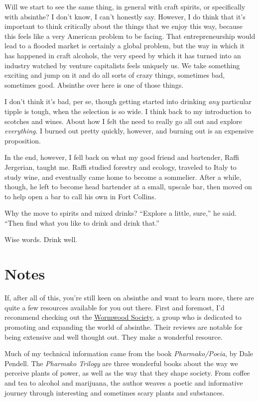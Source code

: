 \documentclass[12pt,letterpaper,oneside]{memoir}
\begin{document}
  Will we start to see the same thing, in general with craft spirits, or specifically with absinthe?  I don't know, I can't honestly say.  However, I do think that it's important to think critically about the things that we enjoy this way, because this feels like a very American problem to be facing.  That entrepreneurship would lead to a flooded market is certainly a global problem, but the way in which it has happened in craft alcohols, the very speed by which it has turned into an industry watched by venture capitalists feels uniquely us.  We take something exciting and jump on it and do all sorts of crazy things, sometimes bad, sometimes good.  Absinthe over here is one of those things.

  I don't think it's bad, per se, though getting started into drinking \textit{any} particular tipple is tough, when the selection is so wide.  I think back to my introduction to scotches and wines.  About how I felt the need to really go all out and explore \textit{everything}.  I burned out pretty quickly, however, and burning out is an expensive proposition.

  In the end, however, I fell back on what my good friend and bartender, Raffi Jergerian, taught me.  Raffi studied forestry and ecology, traveled to Italy to study wine, and eventually came home to become a sommelier.  After a while, though, he left to become head bartender at a small, upscale bar, then moved on to help open a bar to call his own in Fort Collins.

  Why the move to spirits and mixed drinks?  ``Explore a little, sure,'' he said. ``Then find what you like to drink and drink that.''

  Wise words.  Drink well.

  \newpage

  \section*{Notes}

  If, after all of this, you're still keen on absinthe and want to learn more, there are quite a few resources available for you out there.  First and foremost, I'd recommend checking out the \href{wormwoodsociety.org}{Wormwood Society}, a group who is dedicated to promoting and expanding the world of absinthe.  Their reviews are notable for being extensive and well thought out.  They make a wonderful resource.

  Much of my technical information came from the book \textit{Pharmako/Poeia}, by Dale Pendell.  The \textit{Pharmako Trilogy} are three wonderful books about the way we perceive plants of power, as well as the way that they shape society.  From coffee and tea to alcohol and marijuana, the author weaves a poetic and informative journey through interesting and sometimes scary plants and substances.
\end{document}
